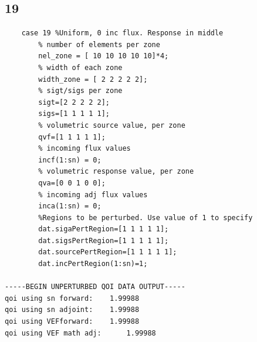 \documentclass{article}
\begin{document}
\subsection{19}
\begin{verbatim}
    case 19 %Uniform, 0 inc flux. Response in middle
        % number of elements per zone
        nel_zone = [ 10 10 10 10 10]*4;
        % width of each zone
        width_zone = [ 2 2 2 2 2];
        % sigt/sigs per zone
        sigt=[2 2 2 2 2];
        sigs=[1 1 1 1 1];
        % volumetric source value, per zone
        qvf=[1 1 1 1 1];
        % incoming flux values
        incf(1:sn) = 0;
        % volumetric response value, per zone
        qva=[0 0 1 0 0];
        % incoming adj flux values
        inca(1:sn) = 0;
        %Regions to be perturbed. Use value of 1 to specify
        dat.sigaPertRegion=[1 1 1 1 1];
        dat.sigsPertRegion=[1 1 1 1 1];
        dat.sourcePertRegion=[1 1 1 1 1];
        dat.incPertRegion(1:sn)=1;
        
-----BEGIN UNPERTURBED QOI DATA OUTPUT----- 
qoi using sn forward: 	 1.99988 
qoi using sn adjoint: 	 1.99988 
qoi using VEFforward: 	 1.99988 
qoi using VEF math adj: 	 1.99988 
\end{verbatim}
\end{document}
